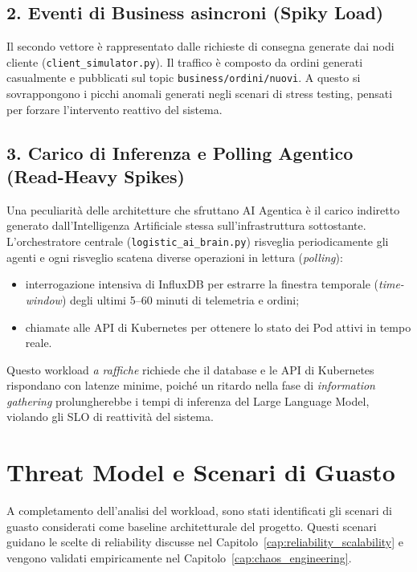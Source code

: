 \subsection*{2. Eventi di Business asincroni (Spiky Load)}
Il secondo vettore è rappresentato dalle richieste di consegna generate dai nodi cliente (\texttt{client\_simulator.py}). Il traffico è composto da ordini generati casualmente e pubblicati sul topic \texttt{business/ordini/nuovi}. A questo si sovrappongono i picchi anomali generati negli scenari di stress testing, pensati per forzare l'intervento reattivo del sistema.

\subsection*{3. Carico di Inferenza e Polling Agentico (Read-Heavy Spikes)}
Una peculiarità delle architetture che sfruttano AI Agentica è il carico indiretto generato dall'Intelligenza Artificiale stessa sull'infrastruttura sottostante. L'orchestratore centrale (\texttt{logistic\_ai\_brain.py}) risveglia periodicamente gli agenti e ogni risveglio scatena diverse operazioni in lettura (\textit{polling}):
\begin{itemize}
    \item interrogazione intensiva di InfluxDB per estrarre la finestra temporale (\textit{time-window}) degli ultimi 5--60 minuti di telemetria e ordini;
    \item chiamate alle API di Kubernetes per ottenere lo stato dei Pod attivi in tempo reale.
\end{itemize}
Questo workload \emph{a raffiche} richiede che il database e le API di Kubernetes rispondano con latenze minime, poiché un ritardo nella fase di \textit{information gathering} prolungherebbe i tempi di inferenza del Large Language Model, violando gli SLO di reattività del sistema.

\section{Threat Model e Scenari di Guasto}
\label{sec:threat_model}

A completamento dell'analisi del workload, sono stati identificati gli scenari di guasto considerati come baseline architetturale del progetto. Questi scenari guidano le scelte di reliability discusse nel Capitolo~\ref{cap:reliability_scalability} e vengono validati empiricamente nel Capitolo~\ref{cap:chaos_engineering}.

